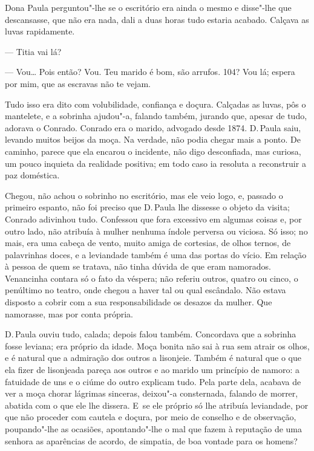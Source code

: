 \begin{linenumbers}
Dona Paula perguntou"-lhe se o escritório era ainda o mesmo e disse"-lhe
que descansasse, que não era nada, dali a duas horas tudo estaria
acabado. Calçava as luvas rapidamente.

--- Titia vai lá?

--- Vou\ldots{} Pois então? Vou. Teu marido é bom, são arrufos. 104? Vou lá;
espera por mim, que as escravas não te vejam.

Tudo isso era dito com volubilidade, confiança e doçura. Calçadas as
luvas, pôs o mantelete, e a sobrinha ajudou"-a, falando também, jurando
que, apesar de tudo, adorava o Conrado. Conrado era o marido, advogado
desde 1874. D.\,Paula saiu, levando muitos beijos da moça. Na verdade,
não podia chegar mais a ponto. De caminho, parece que ela encarou o
incidente, não digo desconfiada, mas curiosa, um pouco inquieta da
realidade positiva; em todo caso ia resoluta a reconstruir a paz
doméstica.

Chegou, não achou o sobrinho no escritório, mas ele veio logo, e,
passado o primeiro espanto, não foi preciso que D.\,Paula lhe dissesse o
objeto da visita; Conrado adivinhou tudo. Confessou que fora excessivo
em algumas coisas e, por outro lado, não atribuía à mulher nenhuma
índole perversa ou viciosa. Só isso; no mais, era uma cabeça de vento,
muito amiga de cortesias, de olhos ternos, de palavrinhas doces, e a
leviandade também é uma das portas do vício. Em relação à pessoa de quem
se tratava, não tinha dúvida de que eram namorados. Venancinha contara
só o fato da véspera; não referiu outros, quatro ou cinco, o penúltimo
no teatro, onde chegou a haver tal ou qual escândalo. Não estava
disposto a cobrir com a sua responsabilidade os desazos da mulher. Que
namorasse, mas por conta própria.

D.\,Paula ouviu tudo, calada; depois falou também. Concordava que a
sobrinha fosse leviana; era próprio da idade. Moça bonita não sai à rua
sem atrair os olhos, e é natural que a admiração dos outros a lisonjeie.
Também é natural que o que ela fizer de lisonjeada pareça aos outros e
ao marido um princípio de namoro: a fatuidade de uns e o ciúme do outro
explicam tudo. Pela parte dela, acabava de ver a moça chorar lágrimas
sinceras, deixou"-a consternada, falando de morrer, abatida com o que ele
lhe dissera. E~se ele próprio só lhe atribuía leviandade, por que não
proceder com cautela e doçura, por meio de conselho e de observação,
poupando"-lhe as ocasiões, apontando"-lhe o mal que fazem à reputação de
uma senhora as aparências de acordo, de simpatia, de boa vontade para os
homens?


\end{linenumbers}
